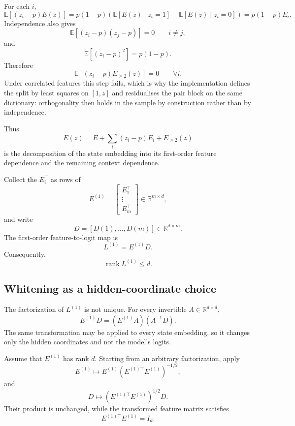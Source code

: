 For each \(i\),
\[
\mathbb E[(z_i-p)E(z)]
=
p(1-p)
\left(
\mathbb E[E(z)\mid z_i=1]
-
\mathbb E[E(z)\mid z_i=0]
\right)
=
p(1-p)E_i.
\]
Independence also gives
\[
\mathbb E[(z_i-p)(z_j-p)]=0
\qquad
i\neq j,
\]
and
\[
\mathbb E[(z_i-p)^2]=p(1-p).
\]
Therefore
\begin{equation}
\mathbb E[(z_i-p)E_{\ge2}(z)]=0
\qquad
\forall i.
\label{eq:app-residual-orthogonal}
\end{equation}
Under correlated features this step fails, which is why the implementation defines the
split by least squares on \([1,z]\) and residualises the pair block on the same
dictionary: orthogonality then holds in the sample by construction rather than by
independence.

Thus
\[
E(z)
=
\bar E
+
\sum_i(z_i-p)E_i
+
E_{\ge2}(z)
\]
is the decomposition of the state embedding into its first-order feature dependence
and the remaining context dependence.

Collect the \(E_i^\top\) as rows of
\[
E^{(1)}
=
\begin{bmatrix}
E_1^\top\\
\vdots\\
E_m^\top
\end{bmatrix}
\in\mathbb R^{m\times d},
\]
and write
\[
D=[D(1),\ldots,D(m)]
\in\mathbb R^{d\times m}.
\]
The first-order feature-to-logit map is
\begin{equation}
\boxed{
L^{(1)}=E^{(1)}D.
}
\label{eq:app-first-order-map}
\end{equation}
Consequently,
\begin{equation}
\boxed{
\operatorname{rank}L^{(1)}\le d.
}
\label{eq:app-first-order-rank}
\end{equation}

\subsection{Whitening as a hidden-coordinate choice}

The factorization of \(L^{(1)}\) is not unique. For every invertible
\(A\in\mathbb R^{d\times d}\),
\[
E^{(1)}D
=
(E^{(1)}A)(A^{-1}D).
\]
The same transformation may be applied to every state embedding, so it changes only
the hidden coordinates and not the model's logits.

Assume that \(E^{(1)}\) has rank \(d\). Starting from an arbitrary factorization,
apply
\begin{equation}
E^{(1)}
\mapsto
E^{(1)}
\left(E^{(1)\top}E^{(1)}\right)^{-1/2},
\label{eq:app-whiten-E}
\end{equation}
and
\begin{equation}
D
\mapsto
\left(E^{(1)\top}E^{(1)}\right)^{1/2}D.
\label{eq:app-whiten-D}
\end{equation}
Their product is unchanged, while the transformed feature matrix satisfies
\begin{equation}
\boxed{
E^{(1)\top}E^{(1)}=I_d.
}
\label{eq:app-whitened-gauge}
\end{equation}


